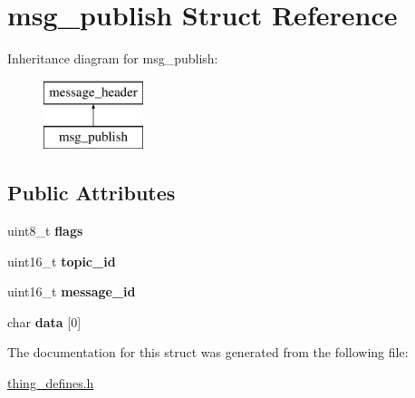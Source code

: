 \hypertarget{structmsg__publish}{\section{msg\-\_\-publish Struct Reference}
\label{structmsg__publish}
}
Inheritance diagram for msg\-\_\-publish\-:\begin{figure}[H]
\begin{center}
\leavevmode
\includegraphics[height=2.000000cm]{structmsg__publish}
\end{center}
\end{figure}
\subsection*{Public Attributes}
\begin{DoxyCompactItemize}
\item 
\hypertarget{structmsg__publish_ad88a1705431981521d2d75e7ce6d42f9}{uint8\-\_\-t {\bfseries flags}}\label{structmsg__publish_ad88a1705431981521d2d75e7ce6d42f9}

\item 
\hypertarget{structmsg__publish_a3773e07cdce2514dd471d6a7aae9ea0d}{uint16\-\_\-t {\bfseries topic\-\_\-id}}\label{structmsg__publish_a3773e07cdce2514dd471d6a7aae9ea0d}

\item 
\hypertarget{structmsg__publish_a736e8364ba9d40e4ead603870064cdfd}{uint16\-\_\-t {\bfseries message\-\_\-id}}\label{structmsg__publish_a736e8364ba9d40e4ead603870064cdfd}

\item 
\hypertarget{structmsg__publish_a24874a8acba3dc087ff98d915031cf16}{char {\bfseries data} \mbox{[}0\mbox{]}}\label{structmsg__publish_a24874a8acba3dc087ff98d915031cf16}

\end{DoxyCompactItemize}


The documentation for this struct was generated from the following file\-:\begin{DoxyCompactItemize}
\item 
\hyperlink{thing__defines_8h}{thing\-\_\-defines.\-h}\end{DoxyCompactItemize}
